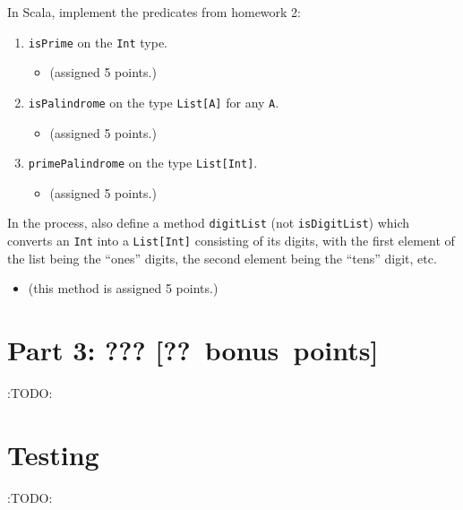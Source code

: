 \documentclass[11pt]{article}
\begin{document}
In Scala, implement the predicates from homework 2:
\begin{enumerate}
\item \texttt{isPrime} on the \texttt{Int} type.
\begin{itemize}
\item (assigned 5 points.)
\end{itemize}
\item \texttt{isPalindrome} on the type \texttt{List[A]} for any \texttt{A}.
\begin{itemize}
\item (assigned 5 points.)
\end{itemize}
\item \texttt{primePalindrome} on the type \texttt{List[Int]}.
\begin{itemize}
\item (assigned 5 points.)
\end{itemize}
\end{enumerate}

In the process, also define a method \texttt{digitList} (not \texttt{isDigitList})
which converts an \texttt{Int} into a \texttt{List[Int]} consisting
of its digits, with the first element of the list being
the “ones” digits, the second element being the “tens” digit, etc.
\begin{itemize}
\item (this method is assigned 5 points.)
\end{itemize}

\section*{Part 3: ??? [?? bonus points]}
\label{sec:org1cb9752}
:TODO:

\section*{Testing}
\label{sec:org2848722}
:TODO:
\end{document}
